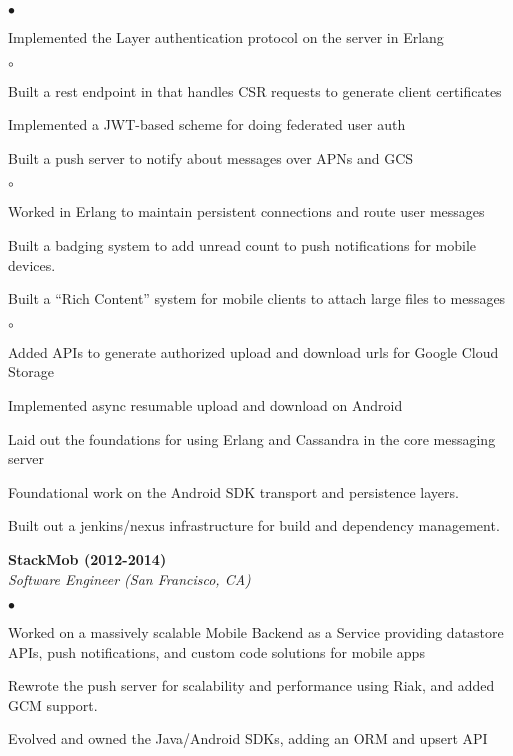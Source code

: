 \documentclass[ComputerScience]{vita}
\newenvironment{suber}[0]
{\begin{list}{$\bullet$}
	{\setlength{\topsep}{-0.4in}
		\setlength{\leftmargin}{0.25in}
		\setlength{\itemsep}{0.01in}}
}
{\end{list}\par}
\newenvironment{suberb}[0]
{\begin{list}{$\circ$}
	{\setlength{\topsep}{-0.4in}
		\setlength{\leftmargin}{0.25in}
		\setlength{\itemsep}{0.01in}}
}
{\end{list}\par}
\begin{document}
\begin{vita}
\begin{list}{}{\setlength{\leftmargin}{.25in}}
\begin{suber}
    \item Implemented the Layer authentication protocol on the server in Erlang
		\begin{suberb}
			\item Built a rest endpoint in that handles CSR requests to generate client certificates
            \item Implemented a JWT-based scheme for doing federated user auth
		\end{suberb}
    \item Built a push server to notify about messages over APNs and GCS
        \begin{suberb}
            \item Worked in Erlang to maintain persistent connections and route user messages
        \end{suberb}
    \item Built a badging system to add unread count to push notifications for mobile devices.
    \item Built a ``Rich Content'' system for mobile clients to attach large files to messages
		\begin{suberb}
            \item Added APIs to generate authorized upload and download urls for Google Cloud Storage
            \item Implemented async resumable upload and download on Android
		\end{suberb}
    \item Laid out the foundations for using Erlang and Cassandra in the core messaging server
    \item Foundational work on the Android SDK transport and persistence layers.
    \item Built out a jenkins/nexus infrastructure for build and dependency management.
    \end{suber}
    \item {\bf StackMob (2012-2014)}\\
    {\em Software Engineer (San Francisco, CA)}
    \begin{suber}
    \item Worked on a massively scalable Mobile Backend as a Service providing
        datastore APIs, push notifications, and custom code solutions for
        mobile apps
	\item Rewrote the push server for scalability and performance using Riak, and added GCM support.
	\item Evolved and owned the Java/Android SDKs, adding an ORM and upsert API

\end{suber}
\end{list}
\end{vita}
\end{document}
